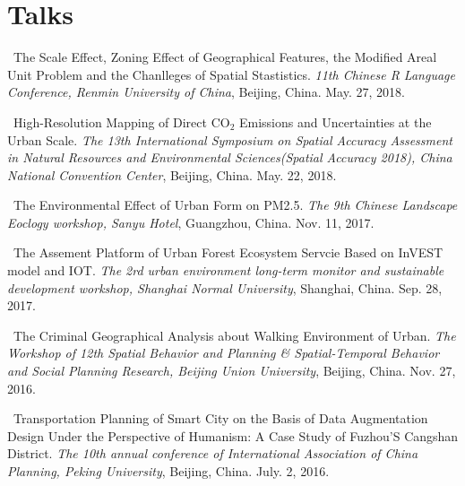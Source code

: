 \section*{Talks}
\begin{etaremune}
\item
    \Shaoqing\
    The Scale Effect, Zoning Effect of Geographical Features, the Modified Areal Unit Problem and the Chanlleges of Spatial Stastistics.
    \textit{11th Chinese R Language Conference, Renmin University of China}, Beijing, China.
    May. 27, 2018.
\item
    \Shaoqing\
    High-Resolution Mapping of Direct CO$_2$ Emissions and Uncertainties at the Urban Scale.
    \textit{The 13th International Symposium on Spatial Accuracy Assessment in Natural Resources and Environmental Sciences(Spatial Accuracy 2018), China National Convention Center}, Beijing, China.
    May. 22, 2018.
\item
    \Shaoqing\
    The Environmental Effect of Urban Form on PM2.5. 
    \textit{The 9th Chinese Landscape Eoclogy workshop, Sanyu Hotel}, Guangzhou, China.
    Nov. 11, 2017.
\item
    \Shaoqing\
    The Assement Platform of Urban Forest Ecosystem Servcie Based on InVEST model and IOT.
    \textit{The 2rd urban environment long-term monitor and sustainable development workshop, Shanghai Normal University}, Shanghai, China.
    Sep. 28, 2017.
    \invited
\item
    \Shaoqing\
    The Criminal Geographical Analysis about Walking Environment of Urban.
    \textit{The Workshop of 12th Spatial Behavior and Planning \& Spatial-Temporal Behavior and Social Planning Research, Beijing Union University}, Beijing, China.
    Nov. 27, 2016.
\item
    \Shaoqing\
    Transportation Planning of Smart City on the Basis of Data Augmentation Design Under the Perspective of Humanism: A Case Study of Fuzhou’S Cangshan District.
    \textit{The 10th annual conference of International Association of China Planning, Peking University}, Beijing, China.
    July. 2, 2016.
\end{etaremune}
